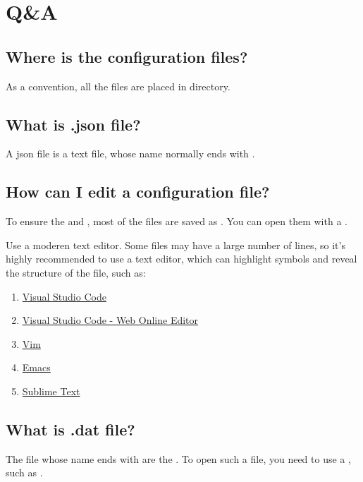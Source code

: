 \chapter{Q\&A}\label{ch:q&a}


\section{Where is the configuration files?}
As a convention, all the files are placed in  directory.


\section{What is .json file?}
A json file is a text file, whose name normally ends with .


\section{How can I edit a configuration file?}
To ensure the  and , most of the files are saved as .
You can open them with a .

\begin{tips}{Use a moderen text editor.}
    Some files may have a large number of lines, so it's highly recommended to use a  text editor, which can highlight symbols and reveal the structure of the file, such as:
    \begin{enumerate}
        \item \href{https://code.visualstudio.com/}{Visual Studio Code}
        \item \href{https://vscode.dev/}{Visual Studio Code - Web Online Editor}
        \item \href{https://www.vim.org/}{Vim}
        \item \href{https://www.gnu.org/software/emacs/}{Emacs}
        \item \href{https://www.sublimetext.com/}{Sublime Text}
    \end{enumerate}
\end{tips}


\section{What is .dat file?}
The file whose name ends with  are the .
To open such a file, you need to use a , such as .


